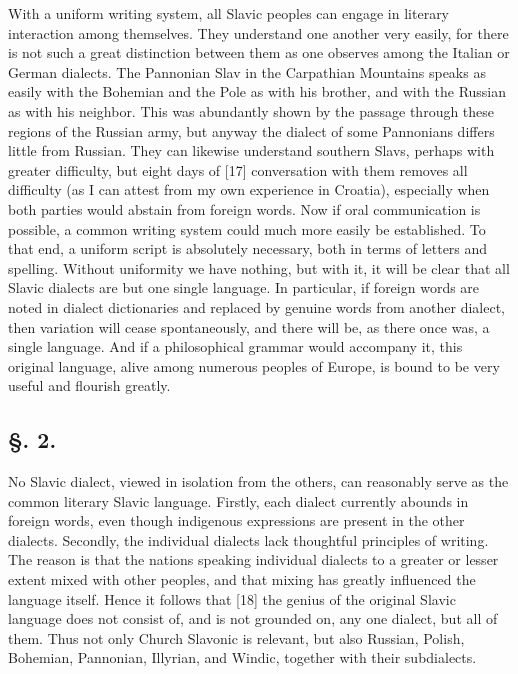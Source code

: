 With a uniform writing system, all Slavic peoples can engage in literary interaction among themselves. They understand one another very easily, for there is not such a great distinction between them as one observes among the Italian or German dialects. The Pannonian Slav in the Carpathian Mountains speaks as easily with the Bohemian and the Pole as with his brother, and with the Russian as with his neighbor. This was abundantly shown by the passage through these regions of the Russian army, but anyway the dialect of some Pannonians differs little from Russian. They can likewise understand southern Slavs, perhaps with greater difficulty, but eight days of [17] conversation with them removes all difficulty (as I can attest from my own experience in Croatia), especially when both parties would abstain from foreign words. Now if oral communication is possible, a common writing system could much more easily be established. To that end, a uniform script is absolutely necessary, both in terms of letters and spelling. Without uniformity we have nothing, but with it, it will be clear that all Slavic dialects are but one single language. In particular, if foreign words are noted in dialect dictionaries and replaced by genuine words from another dialect, then variation will cease spontaneously, and there will be, as there once was, a single language. And if a philosophical grammar would accompany it, this original language, alive among numerous peoples of Europe, is bound to be very useful and flourish greatly.

\subsection*{\hspace*{\fill}§. 2.\hspace*{\fill}}

No Slavic dialect, viewed in isolation from the others, can reasonably serve as the common literary Slavic language. Firstly, each dialect currently abounds in foreign words, even though indigenous expressions are present in the other dialects. Secondly, the individual dialects lack thoughtful principles of writing. The reason is that the nations speaking individual dialects to a greater or lesser extent mixed with other peoples, and that mixing has greatly influenced the language itself. Hence it follows that [18] the genius of the original Slavic language does not consist of, and is not grounded on, any one dialect, but all of them. Thus not only Church Slavonic is relevant, but also Russian, Polish, Bohemian, Pannonian, Illyrian, and Windic, together with their subdialects.

